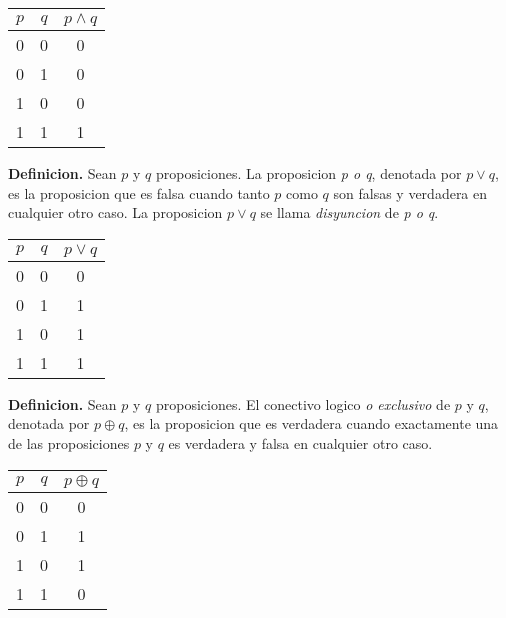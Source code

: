 \documentclass[]{article}
\begin{document}
	\begin{table}[H]
		\begin{center}
			\label{tab:and}
			\begin{tabular}{cc|c}
				$p$ & $q$ & $p \wedge q$ \\
				\hline
				0 & 0 & 0 \\
				0 & 1 & 0 \\
				1 & 0 & 0 \\
				1 & 1 & 1 \\
			\end{tabular}
		\end{center}
	\end{table}

\textbf{Definicion.} Sean $p$ y $q$ proposiciones. La proposicion \textit{p o q}, denotada por $p \vee q$, es la proposicion que es falsa cuando tanto $p$ como $q$ son falsas y verdadera en cualquier otro caso. La proposicion $p \vee q$ se llama \textit{disyuncion} de \textit{p o q}.\\

	\begin{table}[H]
		\begin{center}
			\label{tab:or}
			\begin{tabular}{cc|c}
				$p$ & $q$ & $p \vee q$ \\
				\hline
				0 & 0 & 0 \\
				0 & 1 & 1 \\
				1 & 0 & 1 \\
				1 & 1 & 1 \\
			\end{tabular}
		\end{center}
	\end{table}

\textbf{Definicion.} Sean $p$ y $q$ proposiciones. El conectivo logico \textit{o exclusivo} de $p$ y $q$, denotada por $p \oplus q$, es la proposicion que es verdadera cuando exactamente una de las proposiciones $p$ y $q$ es verdadera y falsa en cualquier otro caso.\\

	\begin{table}[H]
		\begin{center}
			\label{tab:xor}
			\begin{tabular}{cc|c}
				$p$ & $q$ & $p \oplus q$ \\
				\hline
				0 & 0 & 0 \\
				0 & 1 & 1 \\
				1 & 0 & 1 \\
				1 & 1 & 0 \\
			\end{tabular}
		\end{center}
	\end{table}
\end{document}
